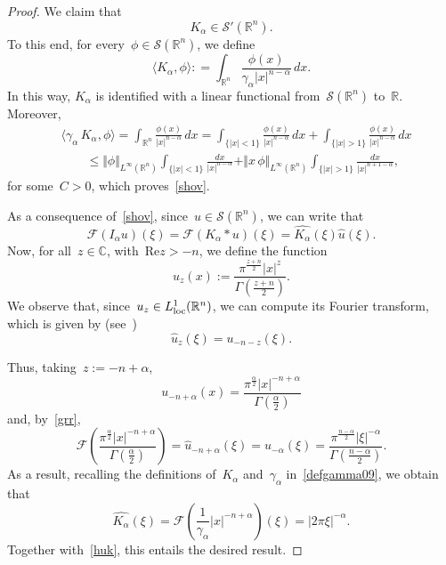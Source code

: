 \documentclass[11pt,hyp,]{nyjm}
\numberwithin{equation}{section}
\newcommand{\R}{\mathbb{R}}
\theoremstyle{remark}
\newcommand{\Int}{\int_{\mathbb{R}^n}}
\renewcommand{\leq}{\leqslant}
\begin{document}
			\begin{proof}
				We claim that
				\begin{equation}\label{shov}
				K_{\alpha} \in \mathcal{S}'(\R^n).
				\end{equation}
				To this end, for every~$\phi \in \mathcal{S}(\R^n)$, we define
	$$\langle  K_{\alpha}, \phi \rangle: 
= \Int \frac{\phi(x)}{\gamma_{\alpha}|x|^{n-\alpha}} \, dx.$$
In this way, $K_\alpha$ is identified with a linear
functional from~$\mathcal{S}(\R^n)$ to~$\R$.
				Moreover,
				\begin{equation*}\begin{split}
					&\langle \gamma_{\alpha} \, K_{\alpha}, \phi \rangle 
					= \Int \frac{\phi(x)}{|x|^{n-\alpha}} \, dx = \int_{\{|x|<1\}} \frac{\phi(x)}{|x|^{n-\alpha}} \, dx + \int_{\{|x|>1\}} \frac{\phi(x)}{|x|^{n-\alpha}} \, dx  \\ 
					&\qquad\leq \Vert \phi \Vert_{L^{\infty}(\R^n)} \int_{\{|x|<1\}} \frac{dx}{|x|^{n-\alpha}}+ \Vert x \, \phi \Vert_{L^{\infty}(\R^n)} \int_{\{|x|>1\}} \frac{dx}{|x|^{n+1-\alpha}},\end{split}\end{equation*} 
		for some~$C>0$, which proves~\eqref{shov}. 
				
				As a consequence of~\eqref{shov}, since~$u \in \mathcal{S}(\R^n)$, we can write that
				\begin{equation}\label{huk}
				\mathcal{F}(I_{\alpha}u)(\xi) = \mathcal{F}(K_{\alpha} \ast u)(\xi) = \widehat{K_{\alpha}}(\xi) \widehat{u}(\xi).
				\end{equation}
				Now, for all~$z \in \mathbb{C}$, with~$\mbox{Re} z >-n$, we define the function
				\[
				u_z(x) := \frac{\pi^{\frac{z+n}{2}}|x|^z }{\Gamma(\frac{z+n}{2})}.
				\]
We observe that, since~$u_z \in L^1_{\rm loc}(\R^n)$, we can compute its Fourier transform, which is given by (see~\cite[Theorem~2.4.6.]{gravakos})
				\begin{equation}\label{grr}
					\widehat{u}_z(\xi)=u_{-n-z}(\xi).
				\end{equation}
				
				Thus, taking~$z:= -n + \alpha$,
				\[
				u_{-n+\alpha} (x)= \frac{\pi^{\frac{\alpha}{2}}|x|^{-n + \alpha} }{\Gamma(\frac{\alpha}{2})} 
				\]
				and, by~\eqref{grr},
				\begin{equation*}
	\mathcal{F}	\left( \frac{\pi^{\frac{\alpha}{2}}|x|^{-n + \alpha} }{\Gamma(\frac{\alpha}{2})}\right) =
	\widehat{u}_{-n+\alpha}(\xi)=u_{-\alpha}(\xi)=
	 \frac{\pi^{\frac{n-\alpha}{2}}|\xi|^{-\alpha}}{\Gamma(\frac{n-\alpha}{2})}.   
				\end{equation*}
As a result, recalling the definitions of~$K_\alpha$ and~$\gamma_\alpha$ in~\eqref{defgamma09}, we obtain that
				\begin{equation}\label{weneedit}
		\widehat{K_{\alpha}}(\xi)= \mathcal{F}\left(\frac1{\gamma_\alpha}
		|x|^{-n+\alpha}\right)(\xi)=  |2\pi \xi|^{-\alpha}. \end{equation}
Together with~\eqref{huk}, this entails the desired result.		
\end{proof}			
\end{document}
